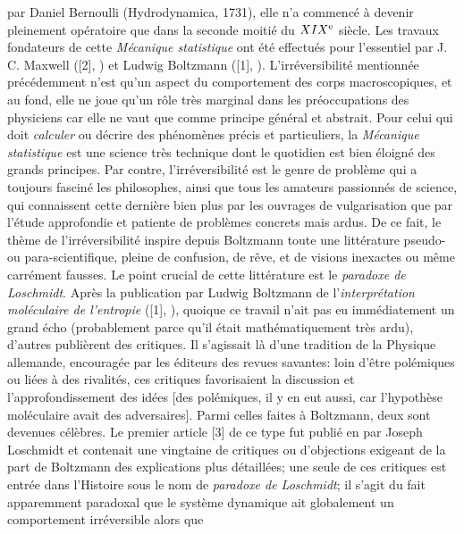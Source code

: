 par Daniel Bernoulli (Hydrodynamica, 1731), elle n'a commenc\'e 
\`a devenir pleinement op\'eratoire que dans la seconde moiti\'e du 
$XIX^{\rm e}$ si\`ecle. Les travaux fondateurs de cette {\it M\'ecanique 
statistique} ont \'et\'e effectu\'es pour l'essentiel par J. C. Maxwell 
([2], {}) et Ludwig Boltzmann ([1], {}). 
L'irr\'eversibilit\'e mentionn\'ee 
pr\'ec\'edemment n'est qu'un aspect du comportement  des corps 
macroscopiques, et au fond, elle ne joue qu'un r\^ole tr\`es marginal dans 
les pr\'eoccupations des physiciens car elle ne vaut que comme principe 
g\'en\'eral et abstrait. Pour celui qui doit {\it calculer} ou d\'ecrire 
des ph\'enom\`enes pr\'ecis et particuliers, la {\it M\'ecanique 
statistique} est une science tr\`es technique dont le quotidien est 
bien \'eloign\'e des grands principes. Par contre, l'irr\'eversibilit\'e 
est le genre de probl\`eme qui a toujours fascin\'e les philosophes, 
ainsi que tous les amateurs passionn\'es de science, qui connaissent 
cette derni\`ere bien plus par les ouvrages de vulgarisation que par 
l'\'etude approfondie et patiente de probl\`emes concrets mais ardus. De 
ce fait, le th\`eme de l'irr\'eversibilit\'e inspire depuis Boltzmann toute 
une litt\'erature pseudo- ou para-scientifique, pleine de confusion, de 
r\^eve, et de visions inexactes ou m\^eme carr\'ement fausses. 
\medskip
Le point crucial de cette litt\'erature est le {\it paradoxe de Loschmidt}. 
Apr\`es la publication par Ludwig Boltzmann de l'{\it interpr\'etation 
mol\'eculaire de l'entropie} ([1], {}), quoique ce travail n'ait 
pas eu imm\'ediatement un grand \'echo (probablement parce qu'il \'etait 
math\'ematiquement tr\`es ardu), d'autres publi\`erent des critiques. Il 
s'agissait l\`a d'une tradition de la Physique allemande, encourag\'ee par 
les \'editeurs des revues savantes: loin d'\^etre pol\'emiques ou li\'ees 
\`a des rivalit\'es, ces critiques favorisaient la discussion et
l'approfondissement des id\'ees [des pol\'emiques, il y en eut aussi, 
car l'hypoth\`ese mol\'eculaire avait des adversaires]. 
Parmi celles faites \`a Boltzmann, deux sont devenues c\'el\`ebres. 
\medskip 
Le premier article [3]
de ce type fut publi\'e en {} par Joseph Loschmidt et 
contenait une vingtaine de critiques ou d'objections exigeant de la 
part de Boltzmann des explications plus d\'etaill\'ees; une seule de ces 
critiques est entr\'ee dans l'Histoire sous le nom de {\it paradoxe de
Loschmidt}; il s'agit du fait apparemment paradoxal que le syst\`eme 
dynamique ait globalement un comportement irr\'eversible alors que 
